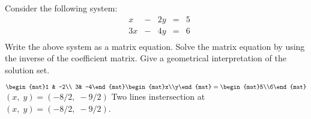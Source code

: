 

\begin{Exercise}[
name={},
title={}, 
difficulty=0,
origin={\cite{YL}}]
Consider the following system:
\[
\begin{array}{ccccccccccccccc}
&x& - &2y& =& 5\\
&3x& - &4y& =& 6\\
\end{array}
\]
\Question Write the above system as a matrix equation.
\Question Solve the matrix equation by using the inverse of the coefficient matrix.
\Question Give a geometrical interpretation of the solution set.

\end{Exercise}

\begin{Answer}
\Question $\begin{mat}1 & -2\\ 3& -4\end{mat}\begin{mat}x\\y\end{mat} = \begin{mat}5\\6\end{mat}$
\Question $(x,\;y)=(-8/2,\;-9/2)$
\Question Two lines instersection at $(x,\;y)=(-8/2,\;-9/2)$.
\end{Answer}
